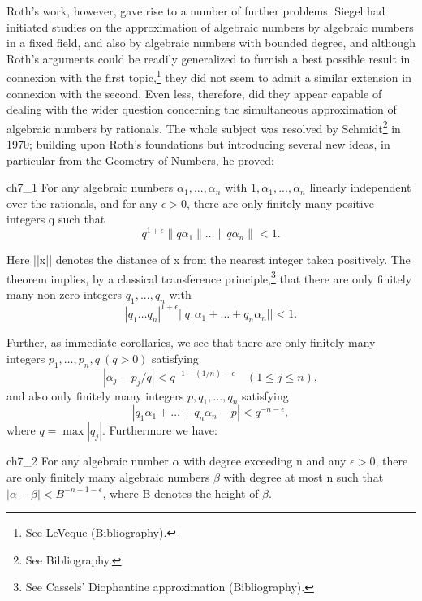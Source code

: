 Roth's work, however, gave rise to a number of further problems. Siegel had initiated studies on the approximation of algebraic numbers by algebraic numbers in a fixed field, and also by algebraic numbers with bounded degree, and although Roth's arguments could be readily generalized to furnish a best possible result in connexion with the first topic,\footnote{See LeVeque (Bibliography).} they did not seem to admit a similar extension in connexion with the second. Even less, therefore, did they appear capable of dealing with the wider question concerning the simultaneous approximation of algebraic numbers by rationals. The whole subject was resolved by Schmidt\footnote{See Bibliography.} in 1970; building upon Roth's foundations but introducing several new ideas, in particular from the Geometry of Numbers, he proved:

\begin{mythm}{}{ch7_1}
For any algebraic numbers  $\alpha_1, ..., \alpha_n$  with  $1, \alpha_1, ..., \alpha_n$  linearly independent over the rationals, and for any  $\epsilon > 0$, there are only finitely many positive integers q such that
\[q^{1+\epsilon}\|q\alpha_1\|\dots\|q\alpha_n\|<1.\]
\end{mythm}

Here ||x|| denotes the distance of x from the nearest integer taken positively. The theorem implies, by a classical transference principle,\footnote{See Cassels' Diophantine approximation (Bibliography).} that there are only finitely many non-zero integers  $q_1, ..., q_n$  with
\[|q_1 \dots q_n|^{1+\epsilon} ||q_1 \alpha_1 + \dots + q_n \alpha_n|| < 1.\]

Further, as immediate corollaries, we see that there are only finitely many integers $p_1, \ldots, p_n, q \ (q > 0)$  satisfying
\[|\alpha_j - p_j/q| < q^{-1-(1/n)-\epsilon} \quad (1 \leqslant j \leqslant n),\]
and also only finitely many integers $p, q_1, ..., q_n$  satisfying
\[|q_1\alpha_1+\ldots+q_n\alpha_n-p|< q^{-n-\epsilon},\]
where  $q = \max |q_j|$. Furthermore we have:

\begin{mythm}{}{ch7_2}
For any algebraic number  $\alpha$  with degree exceeding n and any  $\epsilon > 0$, there are only finitely many algebraic numbers  $\beta$  with degree at most n such that  $|\alpha - \beta| < B^{-n-1-\epsilon}$, where B denotes the height of  $\beta$.
\end{mythm}

